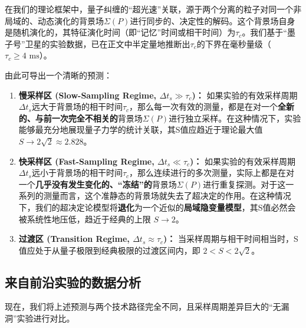 \documentclass[12pt]{article}
\begin{document}
在我们的理论框架中，量子纠缠的``超光速''关联，源于两个分离的粒子对同一个非局域的、动态演化的背景场$\Sigma(P)$进行同步的、决定性的解码。这个背景场自身是随机演化的，其特征演化时间（即``记忆''时间或相干时间）为$\tau_c$。我们基于``墨子号''卫星的实验数据，已在正文中半定量地推断出$\tau_c$的下界在毫秒量级（$\tau_c \geq 4 \text{ ms}$）。

由此可导出一个清晰的预测：

\begin{enumerate}
    \item \textbf{慢采样区 (Slow-Sampling Regime, $\Delta t_s \gg \tau_c$)：}
    如果实验的有效采样周期$\Delta t_s$远大于背景场的相干时间$\tau_c$，那么每一次有效的测量，都是在对一个\textbf{全新的、与前一次完全不相关的}背景场$\Sigma(P)$进行独立采样。在这种情况下，实验能够最充分地展现量子力学的统计关联，其S值应趋近于理论最大值 \textbf{$S \to 2\sqrt{2} \approx 2.828$}。

    \item \textbf{快采样区 (Fast-Sampling Regime, $\Delta t_s \ll \tau_c$)：}
    如果实验的有效采样周期$\Delta t_s$远小于背景场的相干时间$\tau_c$，那么连续进行的多次测量，实际上都是在对一个\textbf{几乎没有发生变化的、``冻结''的}背景场$\Sigma(P)$进行重复探测。对于这一系列的测量而言，这个准静态的背景场就失去了超决定的作用。在这种情况下，我们的超决定论模型将\textbf{退化}为一个近似的\textbf{局域隐变量模型}，其S值必然会被系统性地压低，趋近于经典的上限 \textbf{$S \to 2$}。

    \item \textbf{过渡区 (Transition Regime, $\Delta t_s \approx \tau_c$)：}
    当采样周期与相干时间相当时，S值应处于从量子极限到经典极限的过渡区间内，即 $2 < S < 2\sqrt{2}$。
\end{enumerate}

\subsection{来自前沿实验的数据分析}

现在，我们将上述预测与两个技术路径完全不同，且采样周期差异巨大的``无漏洞''实验进行对比。
\end{document}
